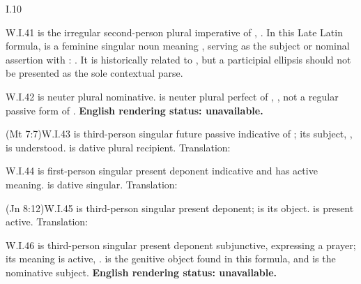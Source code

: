 \begin{courseunit}{I.10}
\begin{workedexample}{}{W.I.41}
 is the irregular second-person plural imperative of
, . In this Late Latin formula,  is a
feminine singular noun meaning , serving as the subject or
nominal assertion with : . It is
historically related to , but a participial ellipsis should not be
presented as the sole contextual parse.
\end{workedexample}

\begin{workedexample}{}{W.I.42}
 is neuter plural nominative.  is neuter plural
perfect of , , not a
regular passive form of .
\textbf{English rendering status: unavailable.}
\end{workedexample}

\begin{workedexample}{ (Mt 7:7)}{W.I.43}
 is third-person singular future passive indicative of
; its subject, , is understood.  is dative
plural recipient. Translation: 
\end{workedexample}

\begin{workedexample}{}{W.I.44}
 is first-person singular present deponent indicative and has
active meaning.  is dative singular. Translation:
\end{workedexample}

\begin{workedexample}{ (Jn 8:12)}{W.I.45}
 is third-person singular present deponent;  is its
object.  is present active. Translation: 
\end{workedexample}

\begin{workedexample}{}{W.I.46}
 is third-person singular present deponent subjunctive,
expressing a prayer; its meaning is active, .
 is the genitive object found in this formula, and
 is the nominative subject.
\textbf{English rendering status: unavailable.}
\end{workedexample}


\end{courseunit}
